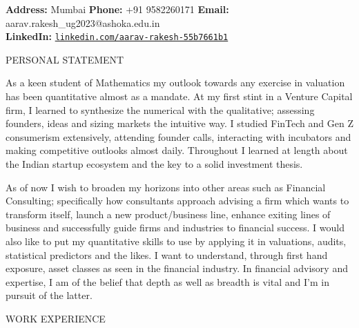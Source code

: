 \documentclass[10pt]{article}
\newenvironment{myenv}{\begin{adjustwidth}{0.5cm}{}}{\end{adjustwidth}}
\newcommand\tab[1][0.5cm]{\hspace*{#1}}
\begin{document}

\smallskip
\noindent\textbf{Address:} Mumbai \tab
\textbf{Phone:} +91 9582260171 \tab
\textbf{Email:} aarav.rakesh\_ug2023@ashoka.edu.in \\
\textbf{LinkedIn:} \href{www.linkedin.com/in/aarav-rakesh-55b7661b1}{\texttt{linkedin.com/aarav-rakesh-55b7661b1}}

\bigskip
\noindent
\vspace{3pt}
{\large \textcolor{bluetwo}{PERSONAL STATEMENT}}
\vspace{3pt}
\hline
\vspace{6pt}

\begin{myenv}
\tab

As a keen student of Mathematics my outlook towards any exercise in valuation has been quantitative almost as a mandate. At my first stint in a Venture Capital firm, I learned to synthesize the numerical with the qualitative; assessing founders, ideas and sizing markets the intuitive way. I studied FinTech and Gen Z consumerism extensively, attending founder calls, interacting with incubators and making competitive outlooks almost daily. Throughout I learned at length about the Indian startup ecosystem and the key to a solid investment thesis.

\bigskip
As of now I wish to broaden my horizons into other areas such as Financial Consulting; specifically how consultants approach advising a firm which wants to transform itself, launch a new product/business line, enhance exiting lines of business and successfully guide firms and industries to financial success. I would also like to put my quantitative skills to use by applying it in valuations, audits, statistical predictors and the likes. I want to understand, through first hand exposure, asset classes as seen in the financial industry. In financial advisory and expertise, I am of the belief that depth as well as breadth is vital and I’m in pursuit of the latter.
\end{myenv}
\bigskip
\noindent
\vspace{3pt}
{\large \textcolor{bluetwo}{WORK EXPERIENCE}}
\vspace{3pt}
\hline
\vspace{6pt}
\end{document}
